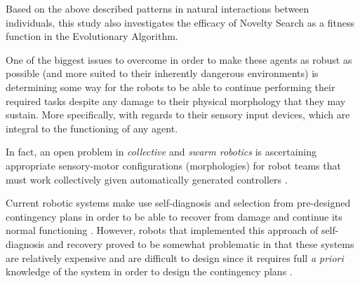 

Based on the above described patterns in natural interactions between individuals, this study also investigates the efficacy of Novelty Search as a fitness function in the Evolutionary Algorithm.


One of the biggest issues to overcome in order to make these agents as robust as possible (and more suited to their inherently dangerous environments) is determining some way for the robots to be able to continue performing their required tasks despite any damage to their physical morphology that they may sustain. More specifically, with regards to their sensory input devices, which are integral to the functioning of any agent.

In fact, an open problem in \textit{collective} \cite{KubeZhang1994B} and \textit{swarm robotics} \cite{Beni2004}
is ascertaining appropriate sensory-motor configurations (morphologies) for robot teams that must work collectively given automatically generated controllers \cite{FloreanoDurrMattiussi2008}.

Current robotic systems make use self-diagnosis and selection from pre-designed contingency plans in order to be able to recover from damage and continue its normal functioning \cite{fenton2001fault, verma2004real, BongardZykovLipson2006}. However, robots that implemented this approach of self-diagnosis and recovery proved to be somewhat problematic in that these systems are relatively expensive and are difficult to design since it requires full \textit{a priori} knowledge of the system in order to design the contingency plans \cite{CullyCluneTaraporeMouret2015}.




